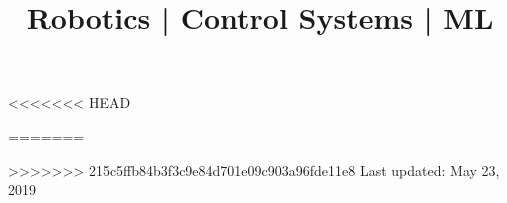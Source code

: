 \documentclass[10pt,a4paper]{moderncv}
\title{Robotics | Control Systems  | ML 
	\newline
	\bf{\lb{\footnotesize
			Rerum Cognoscere Causas: To know the causes of things.} }}
\begin{document}
	\makecvtitle
<<<<<<< HEAD
	
	
	
	
	
	
	
	
	
	
	
	
=======
	
	
	
	
	
	
	
	
	
	
	
>>>>>>> 215c5ffb84b3f3c9e84d701e09c903a96fde11e8
%
	\footnotesize \centering Last updated: May 23, 2019
\clearpage
\end{document}
